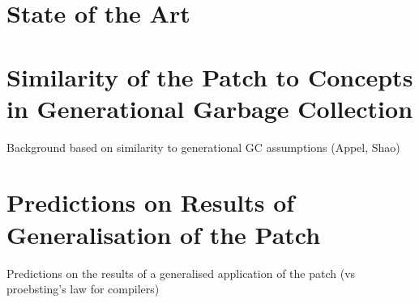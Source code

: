 \section{State of the Art}

\section{Similarity of the Patch to Concepts in Generational Garbage Collection}

Background based on similarity to generational GC assumptions (Appel, Shao)

\section{Predictions on Results of Generalisation of the Patch}

Predictions on the results of a generalised application of the patch (vs proebsting's law for compilers)
